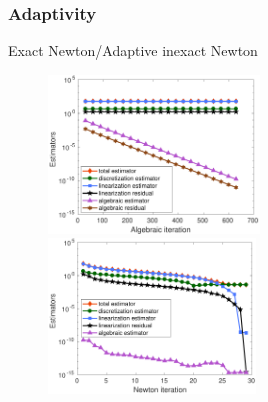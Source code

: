 \begin{frame}
\frametitle{Adaptivity}
\hspace{5.5 cm} Exact Newton/Adaptive inexact Newton \hspace{3.5 cm } 
\begin{figure}
   \centering
\includegraphics[width=0.50\textwidth]{p2/Exact_P2_estimator_GMRES_per_1stNewton}
\includegraphics[width=0.49\textwidth]{p2/Exact_P2_estimator_Newton_iter}
\end{figure}
\end{frame}

